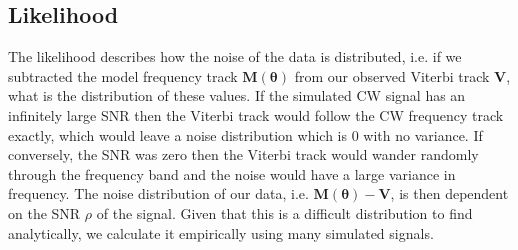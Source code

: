 %
%
\subsection{\label{par_est:bayes:likelihood}Likelihood}
%
%

The likelihood describes how the noise of the data is distributed, i.e. if we subtracted the model frequency track $\bm{M}(\bm{\theta})$ from our observed Viterbi track $\bm{V}$, what is the distribution of these values.
If the simulated \gls{CW} signal has an infinitely large \gls{SNR} then the Viterbi track would follow the \gls{CW} frequency track exactly, which would leave a noise distribution which is 0 with no variance. 
If conversely, the \gls{SNR} was zero then the Viterbi track would wander randomly through the frequency band and the noise would have a large variance in frequency.
The noise distribution of our data, i.e. $\bm{M}(\bm{\theta}) - \bm{V}$, is then dependent on the \gls{SNR} $\rho$ of the signal. 
Given that this is a difficult distribution to find analytically, we calculate it empirically using many simulated signals.

